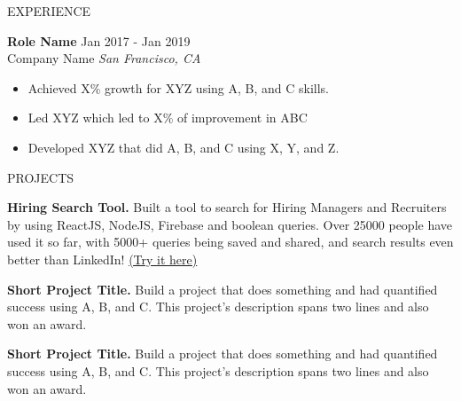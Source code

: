 \documentclass{resume} %
\begin{document}
\begin{rSection}{EXPERIENCE}

\textbf{Role Name} \hfill Jan 2017 - Jan 2019\\
Company Name \hfill \textit{San Francisco, CA}
 \begin{itemize}
    \itemsep -3pt {} 
     \item Achieved X\% growth for XYZ using A, B, and C skills.
     \item Led XYZ which led to X\% of improvement in ABC
    \item Developed XYZ that did A, B, and C using X, Y, and Z. 
 \end{itemize}
 

\end{rSection} 


\begin{rSection}{PROJECTS}
\vspace{-1.25em}
\item \textbf{Hiring Search Tool.} {Built a tool to search for Hiring Managers and Recruiters by using ReactJS, NodeJS, Firebase and boolean queries. Over 25000 people have used it so far, with 5000+ queries being saved and shared, and search results even better than LinkedIn! \href{https://hiring-search.careerflow.ai/}{(Try it here)}}
\item \textbf{Short Project Title.} {Build a project that does something and had quantified success using A, B, and C. This project's description spans two lines and also won an award.}
\item \textbf{Short Project Title.} {Build a project that does something and had quantified success using A, B, and C. This project's description spans two lines and also won an award.}
\end{rSection} 
\end{document}
